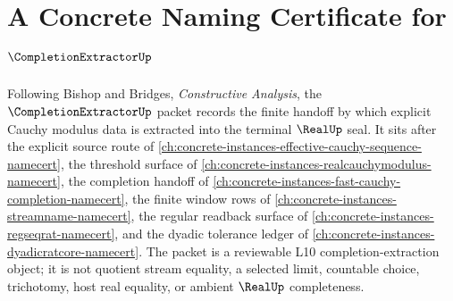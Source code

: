 \chapter{A Concrete Naming Certificate for $\CompletionExtractorUp$}
\label{ch:concrete-instances-completion-extractor-namecert}

Following Bishop and Bridges, \emph{Constructive Analysis}, the $\CompletionExtractorUp$ packet records the finite handoff by which explicit Cauchy modulus data is extracted into the terminal $\RealUp$ seal. It sits after the explicit source route of \autoref{ch:concrete-instances-effective-cauchy-sequence-namecert}, the threshold surface of \autoref{ch:concrete-instances-realcauchymodulus-namecert}, the completion handoff of \autoref{ch:concrete-instances-fast-cauchy-completion-namecert}, the finite window rows of \autoref{ch:concrete-instances-streamname-namecert}, the regular readback surface of \autoref{ch:concrete-instances-regseqrat-namecert}, and the dyadic tolerance ledger of \autoref{ch:concrete-instances-dyadicratcore-namecert}. The packet is a reviewable L10 completion-extraction object; it is not quotient stream equality, a selected limit, countable choice, trichotomy, host real equality, or ambient $\RealUp$ completeness.

